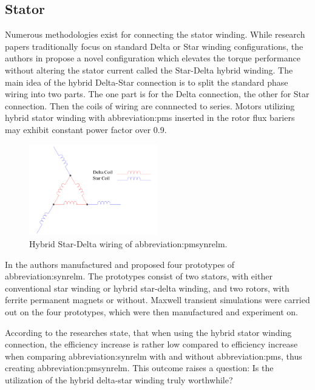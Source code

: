 \documentclass[a4paper, twoside, 11pt]{article}
\begin{document}
    \subsection{Stator}
        Numerous methodologies exist for connecting the stator winding. While research papers traditionally focus on standard Delta or Star winding configurations, the authors in \cite{ibrahim-an-improved-torque-density-synchronous-reluctance-machine-with-a-combined-star-delta-winding-layout, ibrahim-permanent-magnet-assisted-synchronous-reluctance-motor-employing-a-hybrid-star-delta-winding-for-high-speed-applicaitons} propose a novel configuration which elevates the torque performance without altering the stator current called the Star-Delta hybrid winding. The main idea of the hybrid Delta-Star connection is to split the standard phase wiring into two parts. The one part is for the Delta connection, the other for Star connection. Then the coils of wiring are connnected to series. Motors utilizing hybrid stator winding with \gls{abbreviation:pm}s inserted in the rotor flux bariers may exhibit constant power factor over 0.9. \cite{ibrahim-permanent-magnet-assisted-synchronous-reluctance-motor-employing-a-hybrid-star-delta-winding-for-high-speed-applicaitons}

        \begin{figure}[htbp!]
            \centering
            \includegraphics[width=0.5\textwidth]{src/pdf/hybrid-star-delta-wiring.pdf}
            \caption{Hybrid Star-Delta wiring of \gls{abbreviation:pmsynrelm}.}
            \label{fig:hybrid-star-delta-wiring}
        \end{figure}

        In \cite{ibrahim-permanent-magnet-assisted-synchronous-reluctance-motor-employing-a-hybrid-star-delta-winding-for-high-speed-applicaitons} the authors manufactured and proposed four prototypes of \gls{abbreviation:synrelm}. The prototypes consist of two stators, with either conventional star winding or hybrid star-delta winding, and two rotors, with ferrite permanent magnets or without. Maxwell transient simulations were carried out on the four prototypes, which were then manufactured and experiment on.\par
    According to \cite{ibrahim-permanent-magnet-assisted-synchronous-reluctance-motor-employing-a-hybrid-star-delta-winding-for-high-speed-applicaitons} the researches state, that when using the hybrid stator winding connection, the efficiency increase is rather low compared to efficiency increase when comparing \gls{abbreviation:synrelm} with and without \gls{abbreviation:pm}s, thus creating \gls{abbreviation:pmsynrelm}. This outcome raises a question: Is the utilization of the hybrid delta-star winding truly worthwhile?\par
\end{document}
